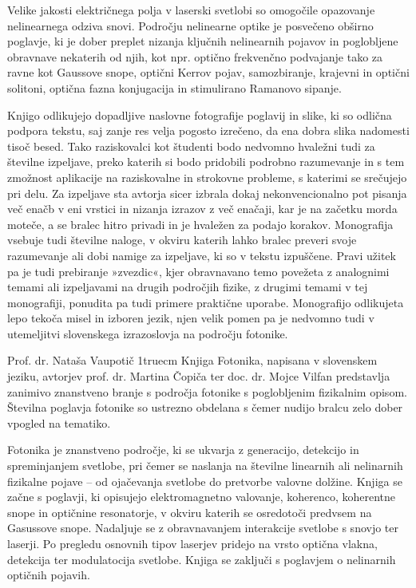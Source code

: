\documentclass[11pt,fleqn]{book} %
\begin{document}
Velike jakosti električnega polja v laserski svetlobi so omogočile opazovanje nelinearnega odziva snovi. Področju nelinearne optike je posvečeno obširno poglavje, ki je dober preplet nizanja ključnih nelinearnih pojavov in poglobljene obravnave nekaterih od njih, kot npr. optično frekvenčno podvajanje tako za ravne kot Gaussove snope, optični Kerrov pojav, samozbiranje, krajevni in optični solitoni, optična fazna konjugacija in stimulirano Ramanovo sipanje.

Knjigo odlikujejo dopadljive naslovne fotografije poglavij in slike, ki so odlična podpora tekstu, saj zanje res velja pogosto izrečeno, da ena dobra slika nadomesti tisoč besed. Tako raziskovalci kot študenti bodo nedvomno hvaležni tudi za številne izpeljave, preko katerih si bodo pridobili podrobno razumevanje in s tem zmožnost aplikacije na raziskovalne in strokovne probleme, s katerimi se srečujejo pri delu. Za izpeljave sta avtorja sicer izbrala dokaj nekonvencionalno pot pisanja več enačb v eni vrstici in nizanja izrazov z več enačaji, kar je na začetku morda moteče, a se bralec hitro privadi in je hvaležen za podajo korakov. Monografija vsebuje tudi številne naloge, v okviru katerih lahko bralec preveri svoje razumevanje ali dobi namige za izpeljave, ki so v tekstu izpuščene. Pravi užitek pa je tudi prebiranje »zvezdic«, kjer obravnavano temo povežeta z analognimi temami ali izpeljavami na drugih področjih fizike, z drugimi temami v tej monografiji, ponudita pa tudi primere praktične uporabe. Monografijo odlikujeta lepo tekoča misel in izboren jezik, njen velik pomen pa je nedvomno tudi v utemeljitvi slovenskega izrazoslovja na področju fotonike.

Prof. dr. Nataša Vaupotič
\thispagestyle{plain}
\vglue1truecm
Knjiga Fotonika, napisana v slovenskem jeziku, avtorjev prof. dr.
Martina Čopiča ter doc. dr. Mojce Vilfan predstavlja zanimivo znanstveno branje s področja fotonike s poglobljenim fizikalnim opisom. Številna poglavja fotonike so ustrezno obdelana s čemer nudijo bralcu zelo dober vpogled na tematiko.

Fotonika je znanstveno področje, ki se ukvarja z generacijo, detekcijo in spreminjanjem svetlobe, pri čemer se naslanja na številne linearnih ali nelinarnih fizikalne pojave – od ojačevanja svetlobe do pretvorbe valovne dolžine. Knjiga se začne s poglavji, ki opisujejo elektromagnetno valovanje, koherenco, koherentne snope in optičnine resonatorje, v okviru katerih se osredotoči predvsem na Gasussove snope. Nadaljuje se z obravnavanjem interakcije svetlobe s snovjo ter laserji. Po pregledu osnovnih tipov laserjev pridejo na vrsto optična vlakna, detekcija ter modulatocija svetlobe. Knjiga se zaključi s poglavjem o nelinarnih optičnih pojavih.
\end{document}
